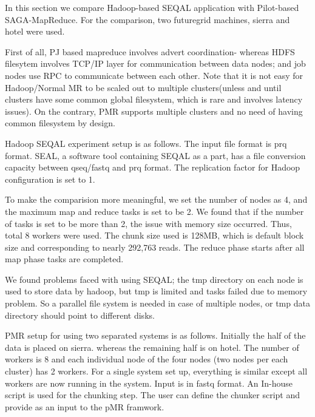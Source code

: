 \documentclass{sig-alternate}
\begin{document}
In this section we compare Hadoop-based SEQAL application with Pilot-based SAGA-MapReduce. 
For the comparison, two futuregrid machines, sierra and hotel were used.

First of all, PJ based mapreduce involves advert coordination- whereas HDFS filesytem involves TCP/IP layer for communication between data nodes; and job nodes use RPC to communicate between each other.
Note that it is not easy for Hadoop/Normal MR to be scaled out to multiple clusters(unless and until clusters have some common global filesystem, which is rare and involves latency issues).  On the contrary, PMR supports  multiple clusters and no need of having common filesystem by design.

Hadoop SEQAL experiment setup is as follows.  The input file format is prq format.  SEAL, a software tool containing SEQAL as a part, has a file conversion capacity between qseq/fastq and prq format.  The replication factor for Hadoop configuration is set  to 1.

To make the comparision more meaningful, we set the number of nodes as 4, and the maximum map and reduce tasks is set to be 2.  We found that if the number of tasks is set to be more than 2, the issue with memory size occurred.    Thus, total 8 workers were used.
The chunk size used is 128MB, which is default block size and corresponding to nearly 292,763 reads.
The reduce phase starts after all map phase tasks are completed. 

We found problems faced with using SEQAL; the tmp directory on each node is used to store data  by hadoop, but tmp is limited and tasks failed due to memory problem.  So a parallel file system is needed in case of multiple nodes, or tmp data directory should point to different disks.

PMR setup for using two separated systems is as follows.  Initially the half of the data is placed on sierra. whereas the remaining half is on hotel. The number of workers is 8 and each individual node of the four nodes (two nodes per each cluster) has 2 workers.  For a single system set up, everything is similar except all workers are now running in the system.  Input is in fastq format. An In-house script is used for the chunking step. The user can define the chunker script and provide as an input to the pMR framwork.  
 
 
\end{document}
